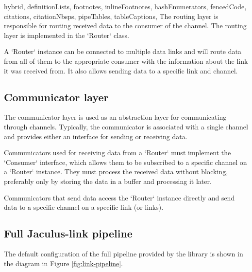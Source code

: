 \begin{markdown*}{%
  hybrid,
  definitionLists,
  footnotes,
  inlineFootnotes,
  hashEnumerators,
  fencedCode,
  citations,
  citationNbsps,
  pipeTables,
  tableCaptions,
}
The routing layer is responsible for routing received data to the consumer of the channel. The routing layer is implemented in the `Router` class.

A `Router` instance can be connected to multiple data links and will route data from all of them to the appropriate consumer with the information about the link it was received from. It also allows sending data to a specific link and channel.

\subsection{Communicator layer}

The communicator layer is used as an abstraction layer for communicating through channels. Typically, the communicator is associated with a single channel and provides either an interface for sending or receiving data.

Communicators used for receiving data from a `Router` must implement the `Consumer` interface, which allows them to be subscribed to a specific channel on a `Router` instance. They must process the received data without blocking, preferably only by storing the data in a buffer and processing it later.

Communicators that send data access the `Router` instance directly and send data to a specific channel on a specific link (or links).

\subsection{Full Jaculus-link pipeline}

The default configuration of the full pipeline provided by the library is shown in the diagram in Figure \ref{fig:link-pipeline}.


\end{markdown*}
